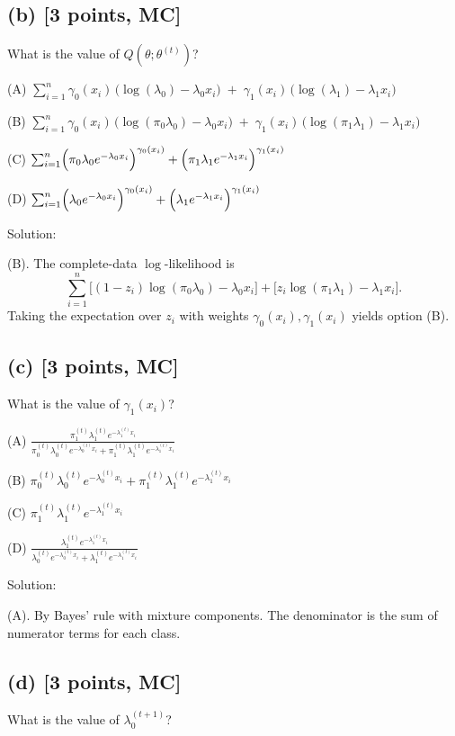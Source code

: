 \documentclass[twocolumn]{article}
\begin{document}
\begin{spacing}{1}
\subsection*{(b) [3 points, MC]}
What is the value of \(Q(\theta;\theta^{(t)})\)?

(A) \(\sum_{i=1}^n \gamma_0(x_i)\,\bigl(\log(\lambda_0) - \lambda_0 x_i\bigr)\;+\;\gamma_1(x_i)\,\bigl(\log(\lambda_1) - \lambda_1 x_i\bigr)\)

(B) \(\sum_{i=1}^n \gamma_0(x_i)\,\bigl(\log(\pi_0\lambda_0) - \lambda_0 x_i\bigr)\;+\;\gamma_1(x_i)\,\bigl(\log(\pi_1\lambda_1) - \lambda_1 x_i\bigr)\)

(C) \(\sum_{i=1}^n \Bigl(\pi_0\lambda_0 e^{-\lambda_0 x_i}\Bigr)^{\gamma_0(x_i)} + \Bigl(\pi_1\lambda_1 e^{-\lambda_1 x_i}\Bigr)^{\gamma_1(x_i)}\)

(D) \(\sum_{i=1}^n \Bigl(\lambda_0 e^{-\lambda_0 x_i}\Bigr)^{\gamma_0(x_i)} + \Bigl(\lambda_1 e^{-\lambda_1 x_i}\Bigr)^{\gamma_1(x_i)}\)

Solution:

(B). The complete-data \(\log\)-likelihood is
\[
\sum_{i=1}^n \bigl[(1-z_i)\log(\pi_0\lambda_0) - \lambda_0 x_i\bigr] + \bigl[z_i\log(\pi_1\lambda_1) - \lambda_1 x_i\bigr].
\]
Taking the expectation over \(z_i\) with weights \(\gamma_0(x_i),\gamma_1(x_i)\) yields option (B).

\subsection*{(c) [3 points, MC]}
What is the value of \(\gamma_1(x_i)\)?

(A) \(\frac{\pi_1^{(t)} \lambda_1^{(t)} e^{-\lambda_1^{(t)} x_i}}
{\pi_0^{(t)} \lambda_0^{(t)} e^{-\lambda_0^{(t)} x_i} + \pi_1^{(t)} \lambda_1^{(t)} e^{-\lambda_1^{(t)} x_i}}\)

(B) \(\pi_0^{(t)} \lambda_0^{(t)} e^{-\lambda_0^{(t)} x_i} + \pi_1^{(t)} \lambda_1^{(t)} e^{-\lambda_1^{(t)} x_i}\)

(C) \(\pi_1^{(t)} \lambda_1^{(t)} e^{-\lambda_1^{(t)} x_i}\)

(D) \(\frac{\lambda_1^{(t)} e^{-\lambda_1^{(t)} x_i}}
{\lambda_0^{(t)} e^{-\lambda_0^{(t)} x_i} + \lambda_1^{(t)} e^{-\lambda_1^{(t)} x_i}}\)

Solution:

(A). By Bayes' rule with mixture components. The denominator is the sum of numerator terms for each class.

\subsection*{(d) [3 points, MC]}
What is the value of \(\lambda_0^{(t+1)}\)?


\end{spacing}
\end{document}
